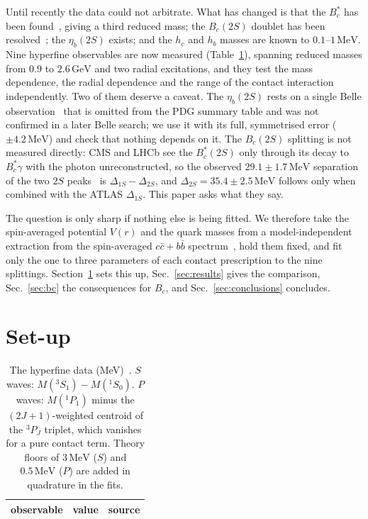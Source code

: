 \documentclass[10pt,twocolumn]{article}
\newcommand{\Bc}{B_c}
\newcommand{\Bcs}{B_c^*}
\newcommand{\cc}{c\bar c}
\newcommand{\bb}{b\bar b}
\newcommand{\MeV}{\,\mathrm{MeV}}
\newcommand{\GeV}{\,\mathrm{GeV}}
\begin{document}
Until recently the data could not arbitrate.
What has changed is that the $\Bcs$ has been found~\cite{ATLAS2026}, giving a third reduced mass; the $\Bc(2S)$ doublet has been resolved~\cite{CMS2019,LHCb2019}; the $\eta_b(2S)$ exists; and the $h_c$ and $h_b$ masses are known to $0.1$--$1\MeV$.
Nine hyperfine observables are now measured (Table~\ref{tab:data}), spanning reduced masses from $0.9$ to $2.6\GeV$ and two radial excitations, and they test the mass dependence, the radial dependence and the range of the contact interaction independently.
Two of them deserve a caveat.
The $\eta_b(2S)$ rests on a single Belle observation~\cite{PDG2026} that is omitted from the PDG summary table and was not confirmed in a later Belle search; we use it with its full, symmetrised error ($\pm4.2\MeV$) and check that nothing depends on it.
The $\Bc(2S)$ splitting is not measured directly: CMS and LHCb see the $\Bcs(2S)$ only through its decay to $\Bcs\gamma$ with the photon unreconstructed, so the observed $29.1\pm1.7\MeV$ separation of the two $2S$ peaks~\cite{CMS2019} is $\Delta_{1S}-\Delta_{2S}$, and $\Delta_{2S}=35.4\pm2.5\MeV$ follows only when combined with the ATLAS $\Delta_{1S}$.
This paper asks what they say.

The question is only sharp if nothing else is being fitted.
We therefore take the spin-averaged potential $V(r)$ and the quark masses from a model-independent extraction from the spin-averaged $\cc+\bb$ spectrum~\cite{Oppong2026b}, hold them fixed, and fit only the one to three parameters of each contact prescription to the nine splittings.
Section~\ref{sec:method} sets this up, Sec.~\ref{sec:results} gives the comparison, Sec.~\ref{sec:bc} the consequences for $\Bc$, and Sec.~\ref{sec:conclusions} concludes.

\section{Set-up}
\label{sec:method}

\begin{table}[t]
\caption{The hyperfine data (MeV)~\cite{PDG2026,ATLAS2026,CMS2019}. $S$ waves: $M(^3S_1)-M(^1S_0)$. $P$ waves: $M(^1P_1)$ minus the $(2J+1)$-weighted centroid of the $^3P_J$ triplet, which vanishes for a pure contact term. Theory floors of $3\MeV$ ($S$) and $0.5\MeV$ ($P$) are added in quadrature in the fits.}
\label{tab:data}
\centering\footnotesize
\begin{tabular}{lcl}
\toprule
observable & value & source \\
\midrule

\end{tabular}
\end{table}
\end{document}
